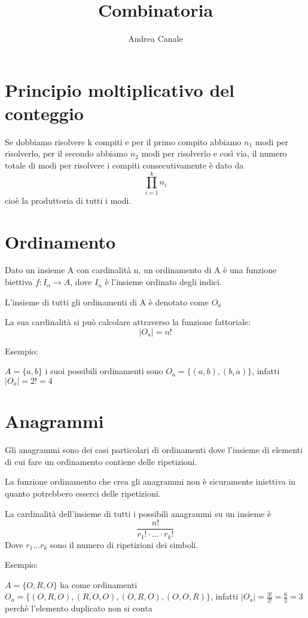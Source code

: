 \documentclass[a4paper, 10pt]{article}
\title{Combinatoria}
\author{Andrea Canale}
\begin{document}
	\maketitle
	\tableofcontents

\section{Principio moltiplicativo del conteggio}

Se dobbiamo risolvere k compiti e per il primo compito abbiamo $n_1$ modi per risolverlo, per il secondo abbiamo $n_2$ modi per risolverlo e così via, il numero totale di modi per risolvere i compiti consecutivamente è dato da $$\prod_{i=1}^k n_i$$ cioè la produttoria di tutti i modi.

\section{Ordinamento}

Dato un insieme A con cardinalità n, un ordinamento di A è una funzione biettiva $f: I_n \rightarrow A$, dove $I_n$ è l'insieme ordinato degli indici.

L'insieme di tutti gli ordinamenti di A è denotato come $O_a$

La sua cardinalità si può calcolare attraverso la funzione fattoriale:
$$|O_a|=n!$$

Esempio:

$A=\{a,b\}$ i suoi possibili ordinamenti sono $O_a=\{(a,b), (b,a)\}$, infatti $|O_a|=2!=4$

\section{Anagrammi}

Gli anagrammi sono dei casi particolari di ordinamenti dove l'insieme di elementi di cui fare un ordinamento contiene delle ripetizioni.

La funzione ordinamento che crea gli anagrammi non è sicuramente iniettiva in quanto potrebbero esserci delle ripetizioni.

La cardinalità dell'insieme di tutti i possibili anagrammi su un insieme è $$\frac{n!}{r_1! \cdot ... \cdot r_k!}$$
Dove $r_1 ... r_k$ sono il numero di ripetizioni dei simboli.

Esempio:

$A=\{O,R,O\}$ ha come ordinamenti $O_a=\{(O,R,O), (R,O,O), (O,R,O), (O,O,R)\}$, infatti $|O_a|=\frac{3!}{2!}=\frac{6}{2}=3$ perchè l'elemento duplicato non si conta
\end{document}
